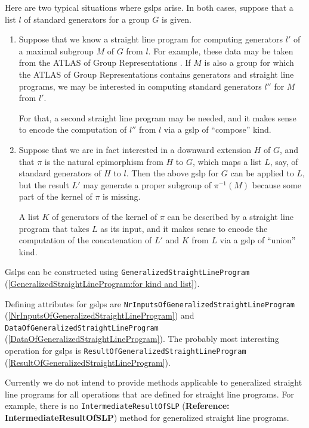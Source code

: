 \documentclass[a4paper,11pt]{report}
\begin{document}
{ Here are two typical situations where gslps arise. In both cases, suppose that
a list $l$ of standard generators for a group $G$ is given. 

 
\begin{enumerate}
\item  Suppose that we know a straight line program for computing generators $l'$ of a maximal subgroup $M$ of $G$ from $l$. For example, these data may be taken from the \textsf{ATLAS} of Group Representations \cite{AGRv3}. If $M$ is also a group for which the \textsf{ATLAS} of Group Representations contains generators and straight line programs, we
may be interested in computing standard generators $l''$ for $M$ from $l'$. 

 For that, a second straight line program may be needed, and it makes sense to
encode the computation of $l''$ from $l$ via a gslp of ``compose'' kind. 
\item  Suppose that we are in fact interested in a downward extension $H$ of $G$, and that $\pi$ is the natural epimorphism from $H$ to $G$, which maps a list $L$, say, of standard generators of $H$ to $l$. Then the above gslp for $G$ can be applied to $L$, but the result $L'$ may generate a proper subgroup of $\pi^{-1}(M)$ because some part of the kernel of $\pi$ is missing. 

 A list $K$ of generators of the kernel of $\pi$ can be described by a straight line program that takes $L$ as its input, and it makes sense to encode the computation of the
concatenation of $L'$ and $K$ from $L$ via a gslp of ``union'' kind. 
\end{enumerate}
 

 Gslps can be constructed using \texttt{GeneralizedStraightLineProgram} (\ref{GeneralizedStraightLineProgram:for kind and list}). 

 Defining attributes for gslps are \texttt{NrInputsOfGeneralizedStraightLineProgram} (\ref{NrInputsOfGeneralizedStraightLineProgram}) and \texttt{DataOfGeneralizedStraightLineProgram} (\ref{DataOfGeneralizedStraightLineProgram}). The probably most interesting operation for gslps is \texttt{ResultOfGeneralizedStraightLineProgram} (\ref{ResultOfGeneralizedStraightLineProgram}). 

 Currently we do not intend to provide methods applicable to generalized
straight line programs for all operations that are defined for straight line
programs. For example, there is no \texttt{IntermediateResultOfSLP} (\textbf{Reference: IntermediateResultOfSLP}) method for generalized straight line programs. 

}
\end{document}
